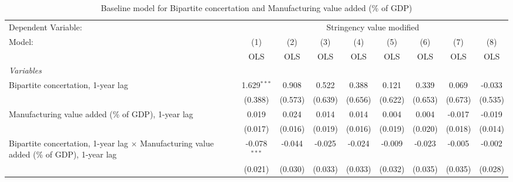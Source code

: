 
\begin{table}[htbp]
   \caption{Baseline model for Bipartite concertation and Manufacturing value added (\% of GDP)}
   \centering
   \begin{tabular}{lcccccccc}
      \toprule
      Dependent Variable: & \multicolumn{8}{c}{Stringency value modified}\\
      Model:                                                                                          & (1)            & (2)           & (3)           & (4)           & (5)           & (6)           & (7)           & (8)\\  
                                                                                                      &  OLS           & OLS           & OLS           & OLS           & OLS           & OLS           & OLS           & OLS\\  
      \midrule
      \emph{Variables}\\
      Bipartite concertation, 1-year lag                                                              & 1.629$^{***}$  & 0.908         & 0.522         & 0.388         & 0.121         & 0.339         & 0.069         & -0.033\\   
                                                                                                      & (0.388)        & (0.573)       & (0.639)       & (0.656)       & (0.622)       & (0.653)       & (0.673)       & (0.535)\\   
      Manufacturing value added (\% of GDP), 1-year lag                                               & 0.019          & 0.024         & 0.014         & 0.014         & 0.004         & 0.004         & -0.017        & -0.019\\   
                                                                                                      & (0.017)        & (0.016)       & (0.019)       & (0.016)       & (0.019)       & (0.020)       & (0.018)       & (0.014)\\   
      Bipartite concertation, 1-year lag $\times$ Manufacturing value added (\% of GDP), 1-year lag   & -0.078$^{***}$ & -0.044        & -0.025        & -0.024        & -0.009        & -0.023        & -0.005        & -0.002\\   
                                                                                                      & (0.021)        & (0.030)       & (0.033)       & (0.033)       & (0.032)       & (0.035)       & (0.035)       & (0.028)\\   

\end{tabular}
\end{table}
